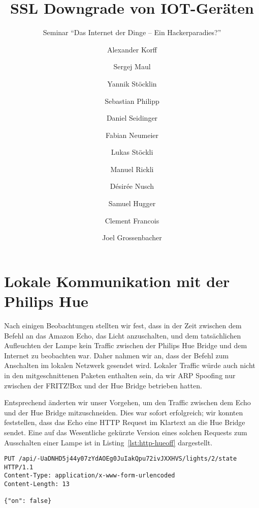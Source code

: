 \documentclass[11pt,a4paper]{scrartcl}
\title{SSL Downgrade von IOT-Geräten}
\subtitle{Seminar ``Das Internet der Dinge -- Ein Hackerparadies?''}
\author{Alexander Korff\and
Sergej Maul\and
Yannik Stöcklin\and
Sebastian Philipp\and
Daniel Seidinger\and
Fabian Neumeier\and
Lukas Stöckli\and
Manuel Rickli\and
Désirée Nusch\and
Samuel Hugger\and
Clement Francois\and
Joel Grossenbacher}
\begin{document}
\maketitle
\section{Lokale Kommunikation mit der Philips Hue}
Nach einigen Beobachtungen stellten wir fest, dass in der Zeit zwischen dem Befehl an das
Amazon Echo, das Licht anzuschalten, und dem tatsächlichen Aufleuchten der Lampe kein
Traffic zwischen der Philips Hue Bridge und dem Internet zu beobachten war. Daher nahmen wir
an, dass der Befehl zum Anschalten im lokalen Netzwerk gesendet wird. Lokaler Traffic würde
auch nicht in den mitgeschnittenen Paketen enthalten sein, da wir ARP Spoofing nur zwischen
der FRITZ!Box und der Hue Bridge betrieben hatten.

Entsprechend änderten wir unser Vorgehen,
um den Traffic zwischen dem Echo und der Hue Bridge mitzuschneiden. Dies war sofort
erfolgreich; wir konnten feststellen, dass das Echo eine HTTP Request im Klartext an die Hue
Bridge sendet. Eine auf das Wesentliche gekürzte Version eines solchen Requests zum
Ausschalten einer Lampe ist in Listing~\ref{lst:http-hueoff} dargestellt.
\begin{lstlisting}[label={lst:http-hueoff},caption={Ein HTTP Request zum Ausschalten von Lampe Nr. 2.},float,floatplacement=H]
PUT /api/-UaDNHD5j44y07zYdAOEg0JuIakQpu72ivJXXHVS/lights/2/state HTTP/1.1
Content-Type: application/x-www-form-urlencoded
Content-Length: 13

{"on": false}
\end{lstlisting}
\end{document}
